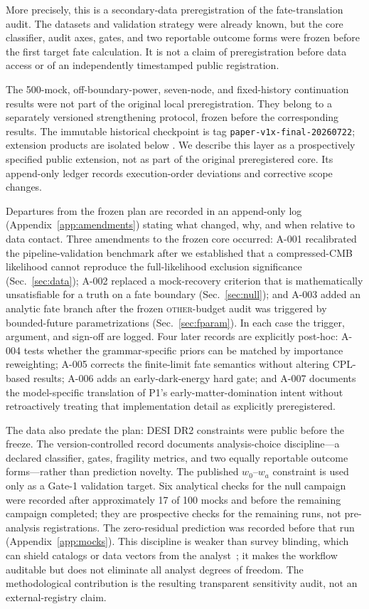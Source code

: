 \documentclass[a4paper,11pt]{article}
\newcommand{\wz}{\ensuremath{w_0}}
\newcommand{\wa}{\ensuremath{w_a}}
\begin{document}
More precisely, this is a secondary-data preregistration of the fate-translation
audit. The datasets and validation strategy were already known, but the core
classifier, audit axes, gates, and two reportable outcome forms were frozen
before the first target fate calculation. It is not a claim of preregistration
before data access or of an independently timestamped public registration.

The 500-mock, off-boundary-power, seven-node, and fixed-history continuation
results were not part of the original local preregistration. They belong to a
separately versioned strengthening protocol, frozen before the corresponding
results. The immutable historical checkpoint is tag
\texttt{paper-v1x-final-20260722}; extension products are isolated below
. We describe this layer as a prospectively
specified public extension, not as part of the original preregistered core.
Its append-only ledger records execution-order deviations and corrective
scope changes.

Departures from the frozen plan are recorded in an append-only log
(Appendix~\ref{app:amendments}) stating what changed, why, and when relative to
data contact. Three amendments to the frozen core occurred: A-001 recalibrated
the pipeline-validation benchmark after we established that a compressed-CMB
likelihood cannot reproduce the full-likelihood exclusion significance
(Sec.~\ref{sec:data}); A-002 replaced a mock-recovery criterion that is
mathematically unsatisfiable for a truth on a fate boundary
(Sec.~\ref{sec:null}); and A-003 added an analytic fate branch after the frozen
\textsc{other}-budget audit was triggered by bounded-future parametrizations
(Sec.~\ref{sec:fparam}). In each case the trigger, argument, and sign-off are
logged. Four later records are explicitly post-hoc: A-004 tests whether the
grammar-specific priors can be matched by importance reweighting; A-005
corrects the finite-limit fate semantics without altering CPL-based results;
A-006 adds an early-dark-energy hard gate; and A-007 documents the
model-specific translation of P1's early-matter-domination intent without
retroactively treating that implementation detail as explicitly
preregistered.

The data also predate the plan: DESI DR2 constraints were public before the
freeze. The version-controlled record documents analysis-choice discipline---a
declared classifier, gates, fragility metrics, and two equally reportable
outcome forms---rather than prediction novelty. The published $\wz$--$\wa$
constraint is used only as a Gate-1 validation target. Six analytical checks
for the null campaign were recorded after approximately 17 of 100 mocks and
before the remaining campaign completed; they are prospective checks for the
remaining runs, not pre-analysis registrations. The zero-residual prediction
was recorded before that run (Appendix~\ref{app:mocks}). This discipline is
weaker than survey blinding, which can shield catalogs or data vectors from the
analyst~\cite{Muir2020,Andrade2025}; it makes the workflow auditable but does
not eliminate all analyst degrees of freedom. The methodological contribution
is the resulting transparent sensitivity audit, not an external-registry claim.
\end{document}
